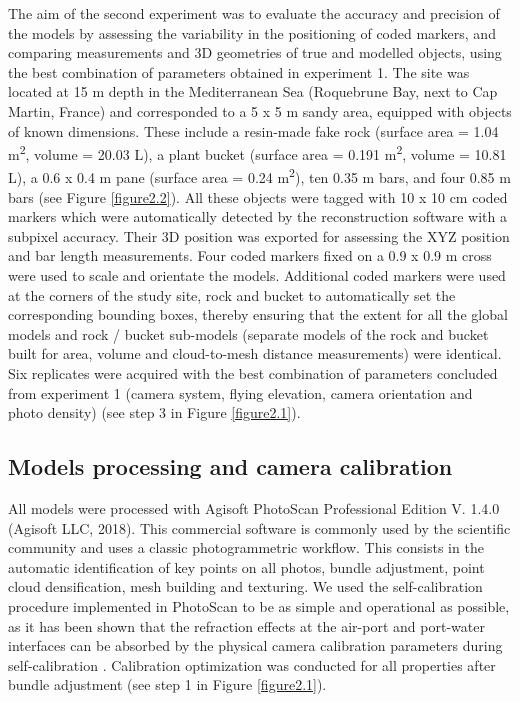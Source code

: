The aim of the second experiment was to evaluate the accuracy and precision of the models by assessing the variability in the positioning of coded markers, and comparing measurements and 3D geometries of true and modelled objects, using the best combination of parameters obtained in experiment 1. The site was located at 15 m depth in the Mediterranean Sea (Roquebrune Bay, next to Cap Martin, France) and corresponded to a 5 x 5 m sandy area, equipped with objects of known dimensions. These include a resin-made fake rock (surface area = 1.04 m\textsuperscript{2}, volume = 20.03 L), a plant bucket (surface area = 0.191 m\textsuperscript{2}, volume = 10.81 L), a 0.6 x 0.4 m pane (surface area = 0.24 m\textsuperscript{2}), ten 0.35 m bars, and four 0.85 m bars (see Figure \ref{figure2.2}). All these objects were tagged with 10 x 10 cm coded markers which were automatically detected by the reconstruction software with a subpixel accuracy. Their 3D position was exported for assessing the XYZ position and bar length measurements. Four coded markers fixed on a 0.9 x 0.9 m cross were used to scale and orientate the models. Additional coded markers were used at the corners of the study site, rock and bucket to automatically set the corresponding bounding boxes, thereby ensuring that the extent for all the global models and rock / bucket sub-models (separate models of the rock and bucket built for area, volume and cloud-to-mesh distance measurements) were identical. Six replicates were acquired with the best combination of parameters concluded from experiment 1 (camera system, flying elevation, camera orientation and photo density) (see step 3 in Figure \ref{figure2.1}).

\subsection{Models processing and camera calibration}\label{chapitre2_2.2}
All models were processed with Agisoft PhotoScan Professional Edition V. 1.4.0 (Agisoft LLC, 2018). This commercial software is commonly used by the scientific community \citep{burns_integrating_2015, burns_utilizing_2015, figueira_accuracy_2015, burns_assessing_2016, guo_accuracy_2016,   casella_mapping_2017, mizuno_simple_2017} and uses a classic photogrammetric workflow. This consists in the automatic identification of key points on all photos, bundle adjustment, point cloud densification, mesh building and texturing. We used the self-calibration procedure implemented in PhotoScan to be as simple and operational as possible, as it has been shown that the refraction effects at the air-port and port-water interfaces can be absorbed by the physical camera calibration parameters during self-calibration \citep{shortis_calibration_2015}. Calibration optimization was conducted for all properties after bundle adjustment (see step 1 in Figure \ref{figure2.1}).

